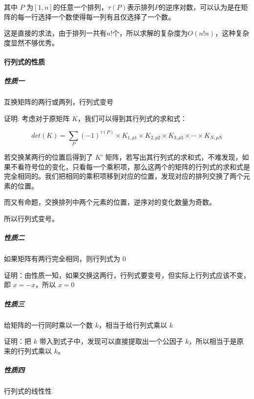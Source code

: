 \documentclass[UTF-8]{ctexart}
\begin{document}
			其中 $P$ 为$[1,n]$的任意一个排列，$\tau(P)$表示排列$P$的逆序对数，可以认为是在矩阵的每一行选择一个数使得每一列有且仅选择了一个数。
			  
			这是直接的求法，由于排列一共有$n!$个，所以求解的复杂度为$O(n!n)$，这种复杂度显然不够优秀。
			
			\paragraph{行列式的性质}
			\subparagraph{性质一} 互换矩阵的两行或两列，行列式变号
			
			证明:	考虑对于原矩阵 $K$，我们可以得到其行列式的求和式：  
			
			$$det(K)=\sum _ {P}{(-1)}^{\tau{(P)}}\times{K} _ {1,p1}\times{K} _ {2,p2}\times{K} _ {3,p3}\times\cdots\times{K} _ {N,pN}$$
			
			若交换某两行的位置后得到了 $K'$ 矩阵，若写出其行列式的求和式，不难发现，如果不看符号位的变化，只看每一个乘积项，那么这两个的矩阵的行列式的求和式是完全相同的。我们把相同的乘积项移到对应的位置，发现对应的排列交换了两个元素的位置。
			
			而又有命题，交换排列中两个元素的位置，逆序对的变化数量为奇数。  
			
			所以行列式变号。
			
			\subparagraph{性质二} 如果矩阵有两行完全相同，则行列式为 $0$
			
			证明：由性质一知，如果交换这两行，行列式要变号，但实际上行列式应该不变，即 $x=-x$，所以 $x=0$
			
			\subparagraph{性质三} 给矩阵的一行同时乘以一个数 $k$，相当于给行列式乘以 $k$
			
			证明：把 $k$ 带入到式子中，发现可以直接提取出一个公因子 $k$，所以相当于是原来的行列式乘以 $k$。
			
			\subparagraph{性质四} 行列式的线性性
			
\end{document}

